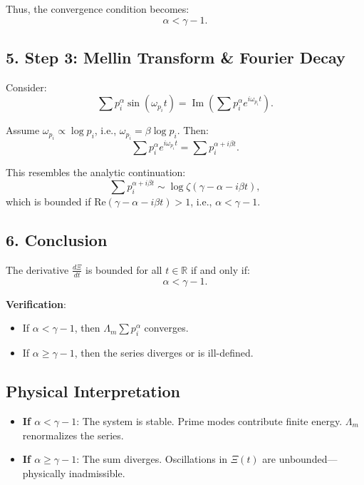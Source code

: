\documentclass{article}
\theoremstyle{plain}
\theoremstyle{claimstyle}
\begin{document}
Thus, the convergence condition becomes:
\[
\boxed{\alpha < \gamma - 1}.
\]

\subsection*{5. Step 3: Mellin Transform \& Fourier Decay}

Consider:
\[
\sum p_i^\alpha \sin(\omega_{p_i} t) = \operatorname{Im} \left( \sum p_i^\alpha e^{i \omega_{p_i} t} \right).
\]

Assume \( \omega_{p_i} \propto \log p_i \), i.e., \( \omega_{p_i} = \beta \log p_i \). Then:
\[
\sum p_i^\alpha e^{i \omega_{p_i} t} = \sum p_i^{\alpha + i \beta t}.
\]

This resembles the analytic continuation:
\[
\sum p_i^{\alpha + i \beta t} \sim \log \zeta(\gamma - \alpha - i \beta t),
\]
which is bounded if \( \text{Re}(\gamma - \alpha - i \beta t) > 1 \), i.e., \( \alpha < \gamma - 1 \).

\subsection*{6. Conclusion}

The derivative \( \frac{d\Xi}{dt} \) is bounded for all \( t \in \mathbb{R} \) if and only if:
\[
\boxed{\alpha < \gamma - 1}.
\]

\textbf{Verification}:
\begin{itemize}
    \item If \( \alpha < \gamma - 1 \), then \( \Lambda_m \sum p_i^\alpha \) converges.
    \item If \( \alpha \geq \gamma - 1 \), then the series diverges or is ill-defined.
\end{itemize}

\subsection*{Physical Interpretation}

\begin{itemize}
    \item \textbf{If \( \alpha < \gamma - 1 \)}: The system is stable. Prime modes contribute finite energy. \( \Lambda_m \) renormalizes the series.
    \item \textbf{If \( \alpha \geq \gamma - 1 \)}: The sum diverges. Oscillations in \( \Xi(t) \) are unbounded—physically inadmissible.
\end{itemize}
\end{document}
